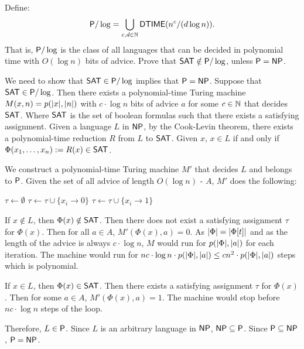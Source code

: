 \begin{question}
Define:
\begin{gather*}
    \mathsf{P}/\log = \bigcup_{c,d\in\mathbb{N}}\mathsf{DTIME}(n^c/(d\log n)).
\end{gather*}
That is, $\mathsf{P}/\log$ is the class of all languages that can be 
decided in polynomial time with $O(\log n)$ bits of advice.
Prove that $\mathsf{SAT}\notin\mathsf{P}/\log$, unless $\mathsf{P}=\mathsf{NP}$.
\begin{answer}
    We need to show that $\mathsf{SAT}\in\mathsf{P}/\log$ implies that $\mathsf{P}=\mathsf{NP}$.
    Suppose that
    $\mathsf{SAT}\in\mathsf{P}/\log$.
    Then there exists a polynomial-time Turing machine $M(x,n)=p(\lvert x\rvert,\lvert n\rvert)$
    with $c\cdot\log n$ bits of advice $a$ for some $c\in\mathbb{N}$
    that decides $\mathsf{SAT}$.
    Where $\mathsf{SAT}$ is the set of boolean formulas such that there exists
    a satisfying assignment.
    Given a language $L$ in $\mathsf{NP}$,
    by the Cook-Levin theorem,
    there exists a polynomial-time reduction
    $R$ from $L$ to $\mathsf{SAT}$.
    Given $x$, $x\in L$ if and only if $\Phi(x_1,\dots,x_n):=R(x)\in\mathsf{SAT}$.
    \par We construct a polynomial-time Turing machine $M'$
    that decides $L$ and belongs to $\mathsf{P}$. Given the set of all advice of length $O(\log n)$ - $A$,
    $M'$ does the following:
    \begin{algorithmic}[1]
        \State $\tau\gets\emptyset$ 
                    \State $\tau\gets\tau\cup\{x_i\to 0\}$
                \Else
                    \State $\tau\gets\tau\cup\{x_i\to 1\}$
                \EndIf
                    \State {}
                \EndIf
            \EndFor
        \EndFor
        \State {}
    \end{algorithmic}
    If $x\notin L$, then $\Phi(x)\notin\mathsf{SAT}$.
    Then there does not exist a satisfying assignment $\tau$ for $\Phi(x)$.
    Then for all $a\in A$, $M'(\Phi(x),a)=0$.
    As $\lvert\Phi\rvert=\lvert\Phi[t]\rvert$ and as the length of the advice is always $c\cdot \log n$,
    $M$ would run for $p(\lvert\Phi\rvert,\lvert a\rvert)$ for each iteration.
    The machine would run for $nc\cdot\log n\cdot p(\lvert\Phi\rvert,\lvert a\rvert)\leq cn^2\cdot p(\lvert\Phi\rvert,\lvert a\rvert)$ steps which is polynomial.
    \par If $x\in L$, then $\Phi(x)\in\mathsf{SAT}$.
    Then there exists a satisfying assignment $\tau$ for $\Phi(x)$.
    Then for some $a\in A$, $M'(\Phi(x),a)=1$.
    The machine would stop before $nc\cdot\log n$ steps of the loop.
    \par Therefore, $L\in\mathsf{P}$. Since $L$ is an arbitrary language in $\mathsf{NP}$,
    $\mathsf{NP}\subseteq\mathsf{P}$. Since $\mathsf{P}\subseteq\mathsf{NP}$, $\mathsf{P}=\mathsf{NP}$.
\end{answer}
\end{question}